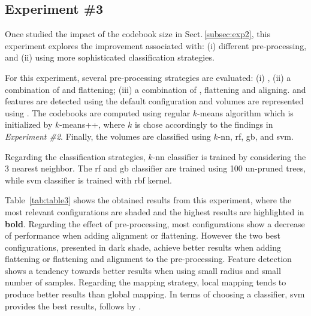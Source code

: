 \subsection{Experiment \#3}\label{subsec:exp3}
%
%
%
%

Once studied the impact of the codebook size in Sect.\,\ref{subsec:exp2}, this experiment explores the improvement associated with: (i) different pre-processing, and (ii) using more sophisticated classification strategies.

For this experiment, several pre-processing strategies are evaluated: (i) \nlm, (ii) a combination of \nlm and flattening; (iii) a combination of \nlm, flattening and aligning.
\lbp and \lbptop features are detected using the default configuration and volumes are represented using \bow.
The codebooks are computed using regular $k$-means algorithm which is initialized by $k$-means++, where $k$ is chose accordingly to the findings in \emph{Experiment \#2}.
Finally, the volumes are classified using $k$-\ac{nn}, \ac{rf}, \ac{gb}, and \ac{svm}.

Regarding the classification strategies, $k$-\ac{nn} classifier is trained by considering the 3 nearest neighbor.
The \ac{rf} and \ac{gb} classifier are trained using 100 un-pruned trees, while \ac{svm} classifier is trained with \ac{rbf} kernel.

Table~\ref{tab:table3} shows the obtained results from this experiment, where the most relevant configurations are shaded and the highest results are highlighted in \textbf{bold}.
Regarding the effect of pre-processing, most configurations show a decrease of performance when adding alignment or flattening.
However the two best configurations, presented in dark shade, achieve better results when adding flattening or flattening and alignment to the pre-processing.
Feature detection shows a tendency towards better results when using small radius and small number of samples.
Regarding the mapping strategy, local mapping tends to produce better results than global mapping.
In terms of choosing a classifier, \ac{svm} provides the best results, follows by \rf.

